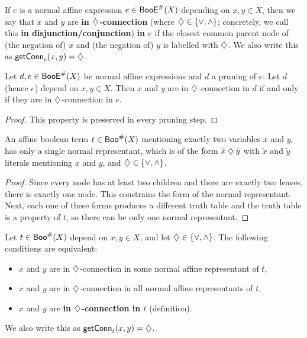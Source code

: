 \documentclass[a4paper]{memoir}
\begin{document}
\begin{definition} \label{def:bool:in-connection}
	If $e$ is a normal affine expression $e \in \mathsf{BooE}^\#(X)$ depending on $x, y \in X$, then we say that $x$ and $y$ are \textbf{in $\mathbin{\diamondsuit}$-connection} (where $\mathbin{\diamondsuit} \in \mathopen{}\left\{ {\vee}, {\wedge} \right\}\mathclose{}$; concretely, we call this \textbf{in disjunction/conjunction}) \textbf{in $e$} if the closest common parent node of (the negation of) $x$ and (the negation of) $y$ is labelled with $\mathbin{\diamondsuit}$.
	We also write this as $\mathsf{getConn}_{e}(x, y) = {\mathbin{\diamondsuit}}$.
\end{definition}
\begin{lemma} \label{thm:bool:pruning-in-connection}
	Let $d, e \in \mathsf{BooE}^\#(X)$ be normal affine expressions and $d$ a pruning of $e$.
	Let $d$ (hence $e$) depend on $x, y \in X$.
	Then $x$ and $y$ are in $\mathbin{\diamondsuit}$-connection in $d$ if and only if they are in $\mathbin{\diamondsuit}$-connection in $e$.
\end{lemma}
\begin{proof}
	This property is preserved in every pruning step.
\end{proof}
\begin{lemma} \label{thm:bool:twovar-normalization}
	An affine boolean term $t \in \mathsf{Boo}^\#(X)$ mentioning exactly two variables $x$ and $y$, has only a single normal representant, which is of the form $\tilde x \mathbin{\diamondsuit} \tilde y$ with $\tilde x$ and $\tilde y$ literals mentioning $x$ and $y$, and $\mathbin{\diamondsuit} \in \mathopen{}\left\{ {\vee}, {\wedge} \right\}\mathclose{}$.
\end{lemma}
\begin{proof}
	Since every node has at least two children and there are exactly two leaves, there is exactly one node. This constrains the form of the normal representant.
	Next, each one of these forms produces a different truth table and the truth table is a property of $t$, so there can be only one normal representant.
\end{proof}
\begin{definitionlemma} \label{thm:bool:term-in-connection}
	Let $t \in \mathsf{Boo}^\#(X)$ depend on $x, y \in X$, and let $\mathbin{\diamondsuit} \in \mathopen{}\left\{ {\vee}, {\wedge} \right\}\mathclose{}$. The following conditions are equivalent:
	\begin{itemize}
		\item $x$ and $y$ are in $\mathbin{\diamondsuit}$-connection in some normal affine representant of $t$,
		\item $x$ and $y$ are in $\mathbin{\diamondsuit}$-connection in all normal affine representants of $t$,
		\item $x$ and $y$ are \textbf{in $\mathbin{\diamondsuit}$-connection in $t$} (definition).
	\end{itemize}
	We also write this as $\mathsf{getConn}_{t}(x, y) = {\mathbin{\diamondsuit}}$.
\end{definitionlemma}
\end{document}

